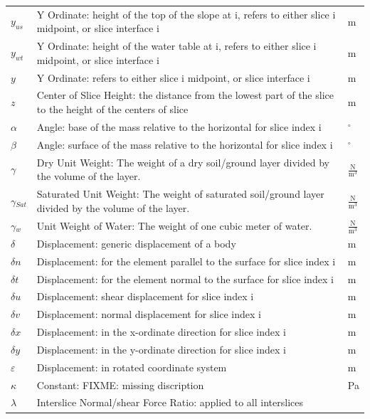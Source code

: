 \documentclass[12pt]{article}
\begin{document}
\begin{longtabu}{l X[l] l}
\\
${y_{us}}$ & Y Ordinate: height of the top of the slope at i, refers to either slice i midpoint, or slice interface i & m
\\
${y_{wt}}$ & Y Ordinate: height of the water table at i, refers to either slice i midpoint, or slice interface i & m
\\
$y$ & Y Ordinate: refers to either slice i midpoint, or slice interface i & m
\\
$z$ & Center of Slice Height: the distance from the lowest part of the slice to the height of the centers of slice & m
\\
$\alpha{}$ & Angle: base of the mass relative to the horizontal for slice index i & ${}^{\circ}$
\\
$\beta{}$ & Angle: surface of the mass relative to the horizontal for slice index i & ${}^{\circ}$
\\
$\gamma{}$ & Dry Unit Weight: The weight of a dry soil/ground layer divided by the volume of the layer. & $\frac{\text{N}}{\text{m}^{3}}$
\\
${\gamma{}_{Sat}}$ & Saturated Unit Weight: The weight of saturated soil/ground layer divided by the volume of the layer. & $\frac{\text{N}}{\text{m}^{3}}$
\\
${\gamma{}_{w}}$ & Unit Weight of Water: The weight of one cubic meter of water. & $\frac{\text{N}}{\text{m}^{3}}$
\\
$\delta{}$ & Displacement: generic displacement of a body & m
\\
$\delta{}n$ & Displacement: for the element parallel to the surface for slice index i & m
\\
$\delta{}t$ & Displacement: for the element normal to the surface for slice index i & m
\\
$\delta{}u$ & Displacement: shear displacement for slice index i & m
\\
$\delta{}v$ & Displacement: normal displacement for slice index i & m
\\
$\delta{}x$ & Displacement: in the x-ordinate direction for slice index i & m
\\
$\delta{}y$ & Displacement: in the y-ordinate direction for slice index i & m
\\
$\varepsilon{}$ & Displacement: in rotated coordinate system & m
\\
$\kappa{}$ & Constant: FIXME: missing discription & Pa
\\
$\lambda{}$ & Interslice Normal/shear Force Ratio: applied to all interslices & 
\\

\end{longtabu}
\end{document}
